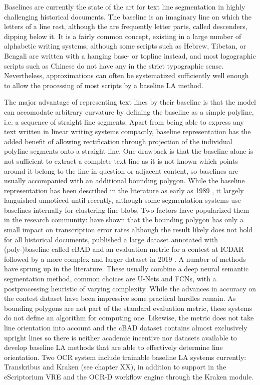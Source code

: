 Baselines are currently the state of the art for text line segmentation in
highly challenging historical documents. The baseline is an imaginary line on
which the letters of a line rest, although the are frequently letter parts,
called descenders, dipping below it. It is a fairly common concept, existing in
a large number of alphabetic writing systems, although some scripts such as
Hebrew, Tibetan, or Bengali are written with a hanging base- or topline
instead, and most logographic scripts such as Chinese do not have any in the
strict typographic sense. Nevertheless, approximations can often be
systematized sufficiently well enough to allow the processing of most scripts
by a baseline LA method.

The major advantage of representing text lines by their baseline is that the
model can accomodate arbitrary curvature by defining the baseline as a simple
polyline, i.e. a sequence of straight line segments. Apart from being able to
express any text written in linear writing systems compactly, baseline
representation has the added benefit of allowing rectification through
projection of the individual polyline segments onto a straight line. One
drawback is that the baseline alone is not sufficient to extract a complete
text line as it is not known which points around it belong to the line in
question or adjacent content, so baselines are usually accompanied with an
additional bounding polygon. While the baseline representation has been
described in the literature as early as 1989 \cite{srihari1989analysis}, it
largely languished unnoticed until recently, although some segmentation
systems\cite{Breuel03highperformance,smith2007overview} use baselines
internally for clustering line blobs. Two factors have popularized them in
the research community: \cite{romero2015influence} have shown that the bounding
polygon has only a small impact on transcription error rates although the
result likely does not hold for all historical documents, \cite{diem2017cbad}
published a large dataset annotated with (poly-)baseline called cBAD and an
evaluation metric for a contest at ICDAR followed by a more complex and larger
dataset in 2019 \cite{diem_markus_2019_3568023}. A number of methods
\cite{xu2018multi,quiros2018multi,mechi2019text,oliveira2018dhsegment,romain2019semi,gruning2019two,melnikov2020fast}
have sprung up in the literature. These usually combine a deep neural semantic
segmentation method, common choices are U-Nets and FCNs, with a postprocessing
heuristic of varying complexity. While the advances in accuracy on the contest
dataset have been impressive some practical hurdles remain. As bounding
polygons are not part of the standard evaluation metric, these systems do not
define an algorithm for computing one. Likewise, the metric does not take line
orientation into account and the cBAD dataset contains almost exclusively
upright lines so there is neither academic incentive nor datasets available to
develop baseline LA methods that are able to effectively determine line
orientation. Two OCR system include trainable baseline LA systems currently:
Transkribus and Kraken (see chapter XX), in addition to support in the
eScriptorium VRE and the OCR-D workflow engine through the Kraken module.

